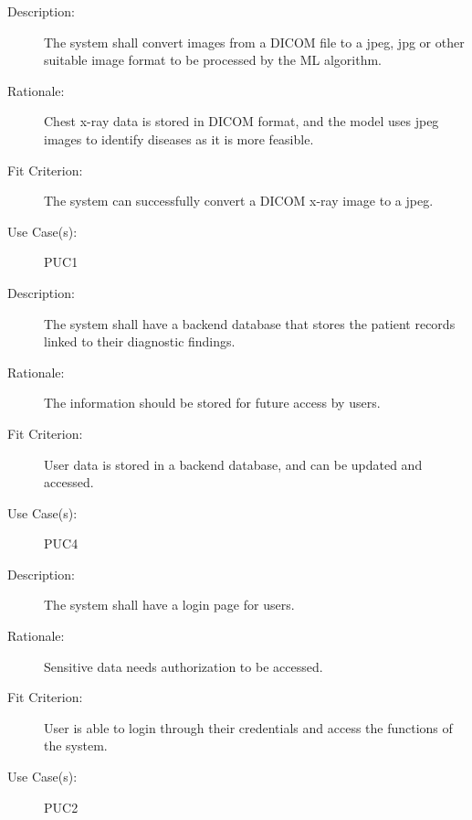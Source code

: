 \documentclass[12pt]{article}
\begin{document}
\begin{enumerate}[label=FR\arabic*., series=frs]
\begin{item}
\begin{description}
            \item[Description:] The system shall convert images from a DICOM file to a jpeg, jpg or other suitable image format to be processed by the ML algorithm.
            \item[Rationale:] Chest x-ray data is stored in DICOM format, and the model uses jpeg images to identify diseases as it is more feasible.
            \item[Fit Criterion:] The system can successfully convert a DICOM x-ray image to a jpeg.
            \item[Use Case(s):] PUC1
        \end{description}
    \end{item}
    \begin{item}
        \begin{description}
            \item[Description:] The system shall have a backend database that stores the patient records linked to their diagnostic findings.
            \item[Rationale:] The information should be stored for future access by users.
            \item[Fit Criterion:] User data is stored in a backend database, and can be updated and accessed.
            \item[Use Case(s):] PUC4
        \end{description}
    \end{item}
    \begin{item}
        \begin{description}
            
            \item[Description:] The system shall have a login page for users.
            \item[Rationale:] Sensitive data needs authorization to be accessed.
            \item[Fit Criterion:] User is able to login through their credentials and access the functions of the system.
            \item[Use Case(s):] PUC2
        \end{description}
    \end{item}
    \begin{item}
        \begin{description}
            

\end{description}
\end{item}
\end{enumerate}
\end{document}
